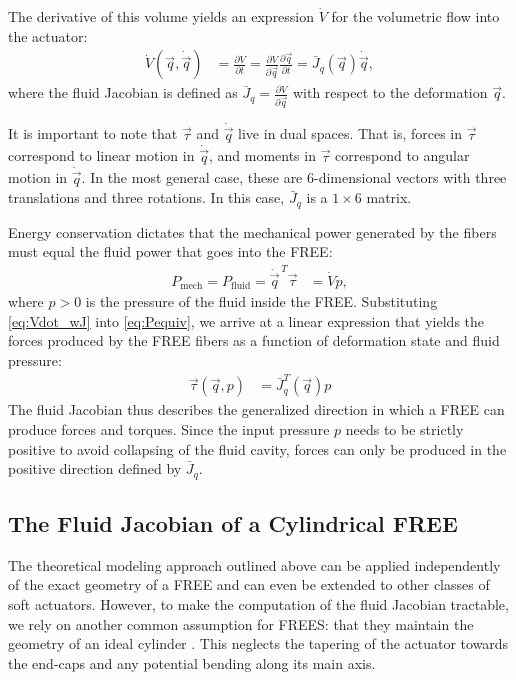 The derivative of this volume yields an expression $\dot{V}$ for the volumetric flow into the actuator:
\begin{align}
    \dot{V} (\vec{q}, \dot{\vec{q}}) &= \frac{\partial V}{\partial t} = \frac{\partial V}{\partial \vec{q}} \frac{\partial \vec{q}}{\partial t } = \bar{J}_q (\vec{q}) \dot{\vec{q}},  \label{eq:Vdot_wJ}
\end{align}
where the fluid Jacobian is defined as $\bar{J}_{q}= \frac{\partial V}{\partial \vec{q}}$ with respect to the deformation $\vec{q}$. 


It is important to note that $\vec{\tau}$ and $\dot{\vec{q}}$ live in dual spaces. 
That is, forces in $\vec{\tau}$ correspond to linear motion in $\dot{\vec{q}}$, and moments in $\vec{\tau}$ correspond to angular motion in $\dot{\vec{q}}$.
In the most general case, these are 6-dimensional vectors with three translations and three rotations.
In this case, $\bar{J}_q$ is a $1 \times 6$ matrix.


Energy conservation dictates that the mechanical power generated by the fibers must equal the fluid power that goes into the FREE:
\begin{align}
    P_{\text{mech}} = P_{\text{fluid}} = \dot{\vec{q}}^{\,T} \vec{\tau} &= \dot{V} p, 
    \label{eq:Pequiv}
\end{align}
%
where $p>0$ is the pressure of the fluid inside the FREE.
Substituting \eqref{eq:Vdot_wJ} into \eqref{eq:Pequiv}, we arrive at a linear expression that yields the forces produced by the FREE fibers as a function of deformation state and fluid pressure: 
\begin{align}
    \vec{\tau} (\vec{q}, p) &= \bar{J}_q^T (\vec{q}) p       \label{eq:fiberF}
\end{align}
The fluid Jacobian thus describes the generalized direction in which a FREE can produce forces and torques.
Since the input pressure $p$ needs to be strictly positive to avoid collapsing of the fluid cavity, forces can only be produced in the positive direction defined by $\bar{J}_q$.


\subsection{The Fluid Jacobian of a Cylindrical FREE}
The theoretical modeling approach outlined above can be applied independently of the exact geometry of a FREE and can even be extended to other classes of soft actuators.
However, to make the computation of the fluid Jacobian tractable, we rely on another common assumption for FREES: that they maintain the geometry of an ideal cylinder \cite{bishop2015design}.
This neglects the tapering of the actuator towards the end-caps and any potential bending along its main axis.

